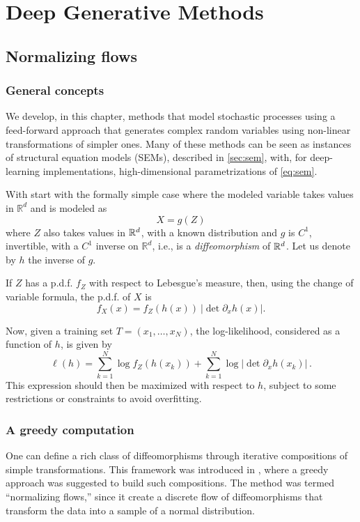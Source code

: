 \chapter{Deep Generative Methods}
\label{chap:generative}


\section{Normalizing flows}
\label{sec:norm.flows}
\subsection{General concepts}
We develop, in this chapter, methods that model stochastic processes using  a feed-forward approach that generates complex random variables using non-linear transformations of simpler ones. Many of these methods can be seen as instances of structural equation models (SEMs), described in \cref{sec:sem}, with, for deep-learning implementations, high-dimensional parametrizations of \cref{eq:sem}. 

With start with the formally simple case where the modeled variable takes values in $\mathbb R^d$ and is modeled as
\[
X = g(Z)
\]
where $Z$ also takes values in ${\mathbb{R}}^d$, with a known distribution and $g$ is $C^1$, invertible, with a $C^1$ inverse on $\mathbb R^d$, i.e., is a {\em diffeomorphism} of ${\mathbb{R}}^d$. Let us denote by $h$ the inverse of $g$.

If $Z$ has a p.d.f. $f_Z$ with respect to Lebesgue's measure, then, using the change of variable formula, the p.d.f. of $X$ is 
\[
f_X(x) = f_Z(h(x))\ |\det{\partial_x h(x)}|.
\]

Now, given a training set $T = (x_1, \ldots, x_N)$, the log-likelihood, considered as a function of $h$, is given by
\begin{equation}
\label{eq:norm.flow.lik}
\ell(h) = \sum_{k=1}^N \log f_Z(h(x_k)) + \sum_{k=1}^N \log |\det{\partial_x h(x_k)}|\,.
\end{equation}
This expression should then be maximized with respect to $h$, subject to some restrictions or constraints to avoid overfitting.


\subsection{A greedy computation}
One can define a rich class of diffeomorphisms through iterative compositions of simple transformations. This framework was introduced in \citep{tabak2010density}, where a greedy approach was suggested to build such compositions. The method was termed ``normalizing flows,'' since it create a discrete flow of diffeomorphisms that transform the data into a sample of a normal distribution.

